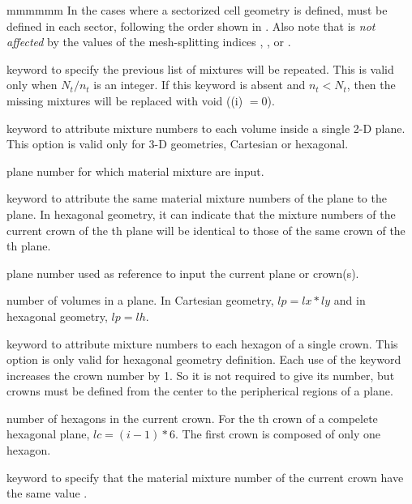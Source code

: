\begin{ListeDeDescription}{mmmmmm}
In the cases where a sectorized cell geometry is defined,  must
be defined in each sector, following the order shown in .
Also note that  is {\sl not affected} by the values of the
mesh-splitting indices , , 
or .

\item[\moc{REPEAT}] keyword to specify the previous list of mixtures will be repeated. This is valid only when $N_t/n_t$ 
is an integer. If this keyword is absent and $n_t < N_t$, then the missing mixtures will be replaced 
with void ((i) $=0$).

\item[\moc{PLANE}] keyword to attribute mixture numbers to each volume inside a single 2-D plane. This option is 
valid only for 3-D geometries, Cartesian or hexagonal. 

\item[\dusa{iplan}] plane number for which material mixture are input. 

\item[\moc{SAME}] keyword to attribute the same material mixture numbers of the  plane to the  plane. In 
hexagonal geometry, it can indicate that the mixture numbers of the current crown of the th 
plane will be identical to those of the same crown of the th plane. 

\item[\dusa{iplan1}] plane number used as reference to input the current plane or crown(s). 

\item[\dusa{lp}] number of volumes in a plane. In Cartesian geometry, $lp=lx*ly$ and in hexagonal geometry, 
$lp=lh$. 

\item[\moc{CROWN}]  keyword to attribute mixture numbers to each hexagon of a single crown. This option is only 
valid for  hexagonal geometry definition. Each use of the keyword  increases 
the crown number by 1. So it is not required to give its number, but crowns must be defined from 
the center to the peripherical regions of a plane. 

\item[\dusa{lc}] number of hexagons in the current crown. For the th crown of a compelete hexagonal plane, 
$lc=(i-1)*6$. The first crown is composed of only one hexagon. 

\item[\moc{ALL}] keyword to specify that the  material mixture number of the current crown have the same value 
. 


\end{ListeDeDescription}
